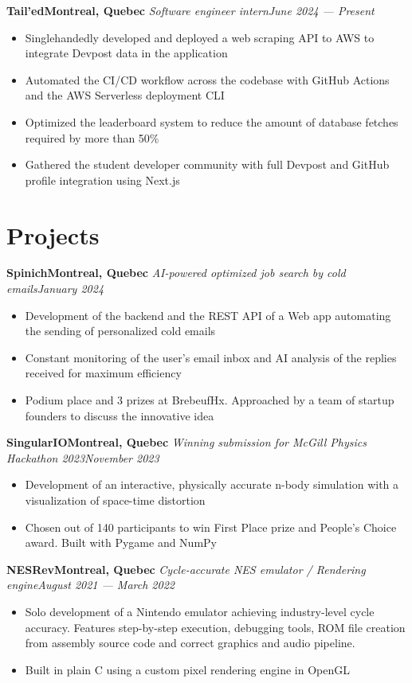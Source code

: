 \documentclass{article}
\newcommand{\newrole}[4]{
    {\normalfont\bfseries #1\hfill#3}
    \newline
    \textit{#2}\hfill\textit{#4}
}
\newenvironment{bulletpoints}{\begin{itemize}\setlength\itemsep{-0.3em}}{\end{itemize}}
\begin{document}
\newrole{Tail'ed}{Software engineer intern}{Montreal, Quebec}{June 2024 --- Present}
\begin{bulletpoints}
    \item Singlehandedly developed and deployed a web scraping API to AWS to integrate Devpost data in the application
    \item Automated the CI/CD workflow across the codebase with GitHub Actions and the AWS Serverless deployment CLI
    \item Optimized the leaderboard system to reduce the amount of database fetches required by more than 50\%
    \item Gathered the student developer community with full Devpost and GitHub profile integration using Next.js
\end{bulletpoints}


\section*{Projects}

\newrole{Spinich}{AI-powered optimized job search by cold emails}{Montreal, Quebec}{January 2024}
\begin{bulletpoints}
    \item Development of the backend and the REST API of a Web app automating the sending of personalized cold emails
    \item Constant monitoring of the user's email inbox and AI analysis of the replies received for maximum efficiency
    \item Podium place and 3 prizes at BrebeufHx. Approached by a team of startup founders to discuss the innovative idea 
\end{bulletpoints}

\newrole{SingularIO}{Winning submission for McGill Physics Hackathon 2023}{Montreal, Quebec}{November 2023}
\begin{bulletpoints}
    \item Development of an interactive, physically accurate n-body simulation with a visualization of space-time distortion
    \item Chosen out of 140 participants to win First Place prize and People’s Choice award. Built with Pygame and NumPy
\end{bulletpoints}

\newrole{NESRev}{Cycle-accurate NES emulator / Rendering engine}{Montreal, Quebec}{August 2021 --- March 2022}
\begin{bulletpoints}
    \item Solo development of a Nintendo emulator achieving industry-level cycle accuracy. Features step-by-step execution, debugging tools, ROM file creation from assembly source code and correct graphics and audio pipeline.
    \item Built in plain C using a custom pixel rendering engine in OpenGL
\end{bulletpoints}
\end{document}

